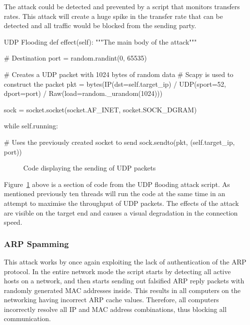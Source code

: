 The attack could be detected and prevented by a script that monitors transfers rates. This attack will create a huge spike in the transfer rate that can be detected and all traffic would be blocked from the sending party.

\begin{Code}{UDP Flooding}
  def effect(self):
        """The main body of the attack"""

        # Destination
        port = random.randint(0, 65535)

        # Creates a UDP packet with 1024 bytes of random data
        # Scapy is used to construct the packet
        pkt = bytes(IP(dst=self.target_ip) / UDP(sport=52, dport=port) / 
        			Raw(load=random._urandom(1024)))

        sock = socket.socket(socket.AF_INET, socket.SOCK_DGRAM)

        while self.running:

            # Uses the previously created socket to send
            sock.sendto(pkt, (self.target_ip, port))
			
\end{Code}
\begin{figure}[h]
	\caption{Code displaying the sending of UDP packets}
	\label{ref:UdpFloodingFigure}
\end{figure}

Figure~\ref{ref:UdpFloodingFigure} above is a section of code from the UDP flooding attack script. As mentioned previously ten threads will run the code at the same time in an attempt to maximise the throughput of UDP packets. The effects of the attack are visible on the target end and causes a visual degradation in the connection speed.

\subsubsection{ARP Spamming}
This attack works by once again exploiting the lack of authentication of the ARP protocol. In the entire network mode the script starts by detecting all active hosts on a network, and then starts sending out falsified ARP reply packets with randomly generated MAC addresses inside. This results in all computers on the networking having incorrect ARP cache values. Therefore, all computers incorrectly resolve all IP and MAC address combinations, thus blocking all communication.

